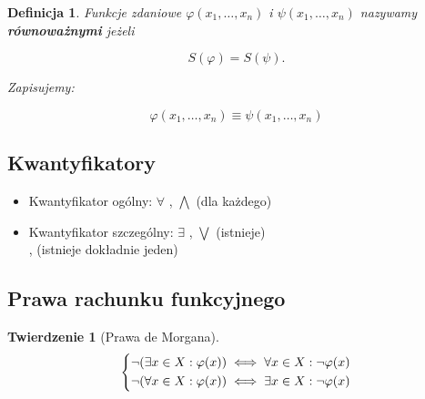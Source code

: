\documentclass[a5paper,8pt]{article}
\theoremstyle{mythmstyle}
\newtheorem{definition}{Definicja}[section]
\newtheorem{theorem}{Twierdzenie}[section]
\newcommand\tab[1][1cm]{\hspace*{#1}}
\begin{document}
        \begin{definition}
            Funkcje zdaniowe $ \varphi (x_1, \ldots, x_n) $ i $ \psi (x_1, \ldots, x_n) $ nazywamy \textbf{równoważnymi} jeżeli

            \begin{equation*}
                S(\varphi) = S(\psi).
            \end{equation*}

            Zapisujemy:

            \begin{equation*}
                \varphi (x_1, \ldots, x_n) \equiv \psi (x_1, \ldots, x_n)
            \end{equation*}

        \end{definition}


        \subsection{Kwantyfikatory} %
        \label{sub:kwantyfikatory}
            \begin{itemize}
                \item Kwantyfikator ogólny: {\LARGE $ \forall $ }, $ \bigwedge $ (dla każdego)
                \item Kwantyfikator szczególny: {\LARGE $ \exists $ }, $ \bigvee $ (istnieje)\\
                \tab \tab \tab \tab {\LARGE $ \exists ! $ }, (istnieje dokładnie jeden)
            \end{itemize}

        \subsection{Prawa rachunku funkcyjnego} %
        \label{sub:prawa_rachunku_funkcyjnego}

            \begin{theorem}[Prawa de Morgana]
                \[
                    \begin{dcases*}
                    \neg( \exists x \in X : \varphi(x)) \iff \forall x \in X : \neg \varphi(x) \\
                    \neg( \forall x \in X : \varphi(x)) \iff \exists x \in X : \neg \varphi(x)
                    \end{dcases*}
                \]
            \end{theorem}
\end{document}
